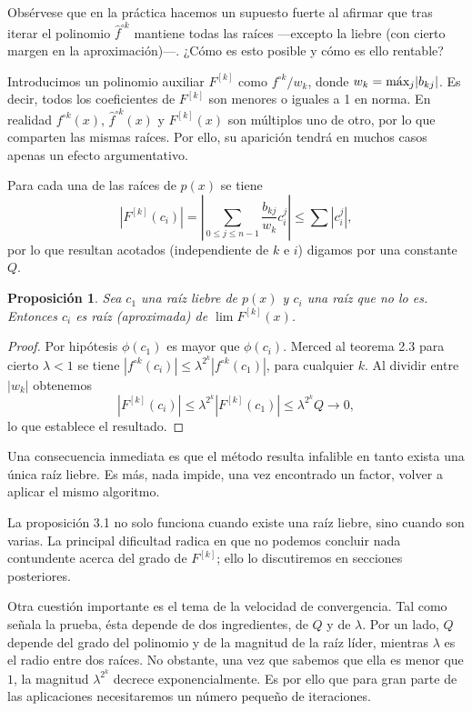 \documentclass[oneside,11pt]{book}
\theoremstyle{definition}
\theoremstyle{plain}
\newtheorem{proposition}[counter]{Proposición}
\theoremstyle{remark}
\begin{document}
Obs\'ervese que en la pr\'actica hacemos un supuesto fuerte
al afirmar que tras iterar el polinomio $\hat{f}^{\circ k}$ mantiene todas las ra\'ices 
---excepto la liebre (con cierto margen en la aproximaci\'on)---. 
¿C\'omo es esto posible y c\'omo es ello rentable?

Introducimos un polinomio auxiliar $F^{[k]}$ como $f^{\circ k}/w_k$, donde $w_k=\hbox{m\'ax}_j{|b_{kj}|}$. 
Es decir, todos los coeficientes de $F^{[k]}$ son menores o iguales a 1 en norma.
En realidad $f^{\circ k}(x)$, $\hat{f}^{\circ k}(x)$ y $F^{[k]}(x)$ 
son m\'ultiplos uno de otro, por lo que comparten las mismas ra\'ices.
Por ello, su aparici\'on tendr\'a en muchos casos apenas un efecto argumentativo. 

Para cada una de las ra\'ices de $p(x)$ 
se tiene 
$$
|F^{[k]}(c_i)|=\left |\sum_{0 \le j \le n-1}\frac{b_{kj}}{w_k}c_i^j \right|\leq\sum|c_i^j|,
$$
por lo que resultan acotados (independiente de $k$ e $i$)
digamos por una constante $Q$.

\begin{proposition}
Sea $c_1$ una ra\'iz liebre de $p(x)$ y 
$c_i$ una ra\'iz que no lo es. 
Entonces $c_i$ es ra\'iz (aproximada) de $\lim F^{[k]}(x)$.
\end{proposition}
\begin{proof}
Por hip\'otesis $\phi(c_1)$ es mayor que $\phi(c_i)$.
Merced al teorema 2.3
para cierto $\lambda<1$ se tiene $|f^{\circ k}(c_i)|  \le \lambda^{2^k} |{f^{\circ k}(c_1)}|$,  
para cualquier $k$. 
Al dividir entre $|w_k|$ obtenemos 
$$
|F^{[k]}(c_i)|  \le \lambda^{2^k} |{F^{[k]}(c_1)}| \le \lambda^{2^k} Q \to 0, 
$$
lo que establece el resultado. 
\end{proof}

Una consecuencia inmediata es que el m\'etodo resulta infalible en tanto exista una \'unica ra\'iz liebre. 
Es m\'as, nada impide, una vez encontrado un factor, volver a aplicar el mismo algoritmo. 

La proposici\'on 3.1 no solo funciona cuando existe una ra\'iz liebre, sino cuando son varias. 
La principal dificultad radica en que no podemos concluir nada contundente acerca del grado de $F^{[k]}$; 
ello lo discutiremos en secciones posteriores.

Otra cuesti\'on importante es el tema de la velocidad de convergencia. 
Tal como se\~nala la prueba, \'esta depende de dos ingredientes, de $Q$ y de $\lambda$.
Por un lado, $Q$ depende del grado del polinomio y de la magnitud de la ra\'iz l\'ider, 
mientras $\lambda$ es el radio entre dos ra\'ices. 
No obstante, una vez que sabemos que ella es menor que $1$, 
la magnitud $\lambda^{2^k}$ decrece exponencialmente. 
Es por ello que para gran parte de las aplicaciones necesitaremos un n\'umero pequeño de iteraciones.
\medskip
\end{document}

